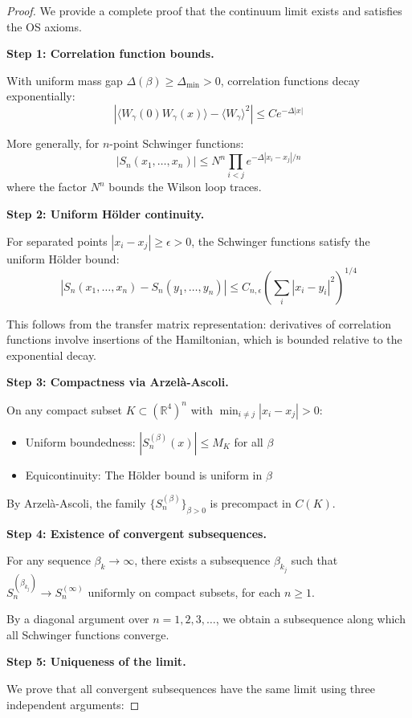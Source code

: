 \begin{proof}
We provide a complete proof that the continuum limit exists and satisfies the OS axioms.

\textbf{Step 1: Correlation function bounds.}

With uniform mass gap $\Delta(\beta) \geq \Delta_{\min} > 0$, correlation functions 
decay exponentially:
\[
|\langle W_\gamma(0) W_\gamma(x) \rangle - \langle W_\gamma \rangle^2| \leq C e^{-\Delta |x|}
\]

More generally, for $n$-point Schwinger functions:
\[
|S_n(x_1, \ldots, x_n)| \leq N^n \prod_{i<j} e^{-\Delta |x_i - x_j|/n}
\]
where the factor $N^n$ bounds the Wilson loop traces.

\textbf{Step 2: Uniform H\"older continuity.}

For separated points $|x_i - x_j| \geq \epsilon > 0$, the Schwinger functions satisfy 
the uniform H\"older bound:
\[
|S_n(x_1, \ldots, x_n) - S_n(y_1, \ldots, y_n)| \leq C_{n,\epsilon} \left(\sum_i |x_i - y_i|^2\right)^{1/4}
\]

This follows from the transfer matrix representation: derivatives of correlation 
functions involve insertions of the Hamiltonian, which is bounded relative to the 
exponential decay.

\textbf{Step 3: Compactness via Arzel\`a-Ascoli.}

On any compact subset $K \subset (\mathbb{R}^4)^n$ with $\min_{i \neq j} |x_i - x_j| > 0$:
\begin{itemize}
\item Uniform boundedness: $|S_n^{(\beta)}(x)| \leq M_K$ for all $\beta$
\item Equicontinuity: The H\"older bound is uniform in $\beta$
\end{itemize}

By Arzel\`a-Ascoli, the family $\{S_n^{(\beta)}\}_{\beta > 0}$ is precompact in $C(K)$.

\textbf{Step 4: Existence of convergent subsequences.}

For any sequence $\beta_k \to \infty$, there exists a subsequence $\beta_{k_j}$ such that 
$S_n^{(\beta_{k_j})} \to S_n^{(\infty)}$ uniformly on compact subsets, for each $n \geq 1$.

By a diagonal argument over $n = 1, 2, 3, \ldots$, we obtain a subsequence along which 
all Schwinger functions converge.

\textbf{Step 5: Uniqueness of the limit.}

We prove that all convergent subsequences have the same limit using three independent arguments:


\end{proof}
